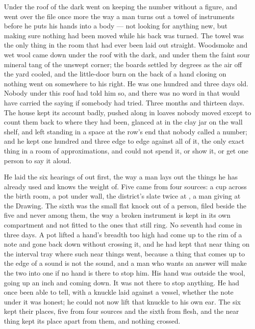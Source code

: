 Under the roof of  the dark went on keeping the number without a figure, and  went over the file once more the way a man turns out a towel of instruments before he puts his hands into a body --- not looking for anything new, but making sure nothing had been moved while his back was turned. The towel was the only thing in the room that had ever been laid out straight. Woodsmoke and wet wool came down under the roof with the dark, and under them the faint sour mineral tang of the unswept corner; the boards settled by degrees as the air off the yard cooled, and the little-door burn on the back of a hand closing on nothing went on somewhere to his right. He was one hundred and three days old. Nobody under this roof had told him so, and there was no word in  that would have carried the saying if somebody had tried. Three months and thirteen days. The house kept its account badly, pushed along  in loaves nobody moved except to count them back to where they had been, glanced at in the clay jar on the wall shelf, and left standing in a space at the row's end that nobody called a number; and he kept one hundred and three edge to edge against all of it, the only exact thing in a room of approximations, and could not spend it, or show it, or get one person to say it aloud.

He laid the six hearings of  out first, the way a man lays out the things he has already used and knows the weight of. Five came from four sources: a cup across the birth room, a pot under  wall, the district's slate twice at , a man giving at the Drawing. The sixth was the small flat knock out of a person, filed beside the five and never among them, the way a broken instrument is kept in its own compartment and not fitted to the ones that still ring. No seventh had come in three days. A pot lifted a hand's breadth too high had come up to the rim of a note and gone back down without crossing it, and he had kept that near thing on the interval tray where such near things went, because a thing that comes up to the edge of a sound is not the sound, and a man who wants an answer will make the two into one if no hand is there to stop him. His hand was outside the wool, going up an inch and coming down. It was not there to stop anything. He had once been able to tell, with a knuckle laid against a vessel, whether the note under it was honest; he could not now lift that knuckle to his own ear. The six kept their places, five from four sources and the sixth from flesh, and the near thing kept its place apart from them, and nothing crossed.

